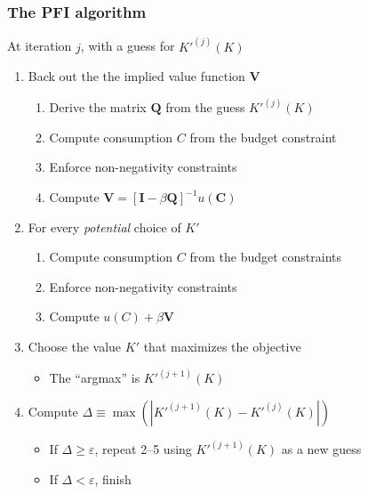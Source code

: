 \documentclass[10pt, aspectratio=1610, handout]{beamer}
\begin{document}
  \begin{frame}
    \frametitle{The PFI algorithm}

    At iteration $j$, with a guess for $K'^{(j)}(K)$

    \vfill\pause

    \begin{enumerate}
      \item Back out the the implied value function $\mathbf{V}$
        \begin{enumerate}
          \item Derive the matrix $\mathbf{Q}$ from the guess $K'^{(j)}(K)$
          \item Compute consumption $C$ from the budget constraint
          \item Enforce non-negativity constraints
          \item Compute $\mathbf{V} = {\left[ \mathbf{I} - \beta \mathbf{Q} \right]}^{-1} u(\mathbf{C})$
        \end{enumerate}
      \vfill\pause
      \item For every \emph{potential} choice of $K'$
        \begin{enumerate}
          \item Compute consumption $C$ from the budget constraints
          \item Enforce non-negativity constraints
          \item Compute $u(C) + \beta \mathbf{V}$
        \end{enumerate}
      \vfill\pause
      \item Choose the value $K'$ that maximizes the objective
        \begin{itemize}
          \item The ``argmax'' is $K'^{(j+1)}(K)$
        \end{itemize}
      \vfill\pause
      \item Compute $\Delta \equiv \max \left(  \left| K'^{(j+1)}(K) - K'^{(j)}(K) \right| \right)$
        \begin{itemize}
          \item If $\Delta \geq \varepsilon$, repeat 2--5 using $K'^{(j+1)}(K)$ as a new guess
          \item If $\Delta < \varepsilon$, finish
        \end{itemize}
    \end{enumerate}

  \end{frame}
\end{document}
